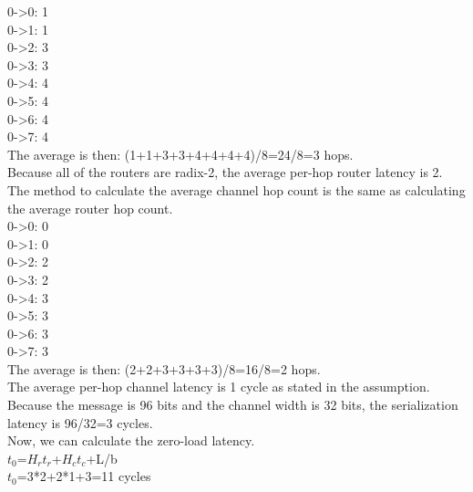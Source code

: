 \documentclass[10pt]{article}
\begin{document}
0->0: 1\\
0->1: 1\\
0->2: 3\\
0->3: 3\\
0->4: 4\\
0->5: 4\\ 
0->6: 4\\ 
0->7: 4\\ 
The average is then: (1+1+3+3+4+4+4+4)/8=24/8=3 hops.\\
Because all of the routers are radix-2, the average per-hop router latency is 2.\\
The method to calculate the average channel hop count is the same as calculating the average router hop count. \\
0->0: 0\\
0->1: 0\\
0->2: 2\\
0->3: 2\\
0->4: 3\\
0->5: 3\\ 
0->6: 3\\ 
0->7: 3\\
The average is then: (2+2+3+3+3+3)/8=16/8=2 hops.\\
The average per-hop channel latency is 1 cycle as stated in the assumption.\\
Because the message is 96 bits and the channel width is 32 bits, the serialization latency is 96/32=3 cycles.\\
Now, we can calculate the zero-load latency.\\
$t_0$=$H_r$$t_r$+$H_c$$t_c$+L/b\\
$t_0$=3*2+2*1+3=11 cycles
\end{document}
